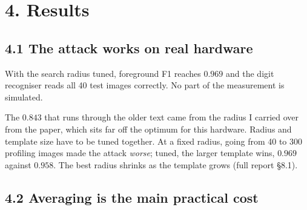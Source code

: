 \documentclass[11pt,a4paper]{article}
\begin{document}
\section*{4. Results}

\begin{table}[H]
  \centering
  \small
  \resizebox{\textwidth}{!}{}
  \caption{Main results. Every row is a real hardware capture. Compare the
  ``all-background'' column with the pixel accuracy on its left.}
  \label{tab:headline}
\end{table}

\begin{table}[H]
  \centering
  \small
  \resizebox{\textwidth}{!}{}
  \caption{Hardware provenance of the captures used here. The functional check writes an
  image and a kernel to the FPGA, reads back the 676 outputs and compares them with a CPU
  model.}
\end{table}

\subsection*{4.1 The attack works on real hardware}

With the search radius tuned, foreground F1 reaches $\mathbf{0.969}$ and the digit
recogniser reads all 40 test images correctly. No part of the measurement is simulated.

The $0.843$ that runs through the older text came from the radius I carried over from the
paper, which sits far off the optimum for this hardware. Radius and template size have to
be tuned together. At a fixed radius, going from 40 to 300 profiling images made the
attack \emph{worse}; tuned, the larger template wins, $0.969$ against $0.958$. The best
radius shrinks as the template grows (full report \S8.1).

\begin{table}[H]
  \centering
  \small
  \resizebox{\textwidth}{!}{}
  \caption{Foreground F1 against the search radius $\delta$. Both curves are unimodal,
  and the value carried over from the paper sits far off the optimum for this hardware.}
  \label{tab:delta}
\end{table}

\subsection*{4.2 Averaging is the main practical cost}
\end{document}
